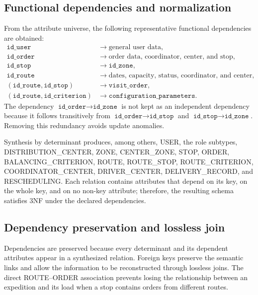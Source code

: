 \documentclass[12pt,a4paper]{article}
\newcommand{\field}[1]{\texttt{#1}}
\begin{document}
\subsection{Functional dependencies and normalization}
From the attribute universe, the following representative functional dependencies are obtained:
\begin{align*}
\field{id\_user} &\rightarrow \text{general user data},\\
\field{id\_order} &\rightarrow \text{order data, coordinator, center, and stop},\\
\field{id\_stop} &\rightarrow \field{id\_zone},\\
\field{id\_route} &\rightarrow \text{dates, capacity, status, coordinator, and center},\\
(\field{id\_route},\field{id\_stop}) &\rightarrow \field{visit\_order},\\
(\field{id\_route},\field{id\_criterion}) &\rightarrow \field{configuration\_parameters}.
\end{align*}
The dependency $\field{id\_order} \rightarrow \field{id\_zone}$ is not kept as an independent dependency because it follows transitively from $\field{id\_order} \rightarrow \field{id\_stop}$ and $\field{id\_stop} \rightarrow \field{id\_zone}$. Removing this redundancy avoids update anomalies.

Synthesis by determinant produces, among others, USER, the role subtypes, DISTRIBUTION\_CENTER, ZONE, CENTER\_ZONE, STOP, ORDER, BALANCING\_CRITERION, ROUTE, ROUTE\_STOP, ROUTE\_CRITERION, COORDINATOR\_CENTER, DRIVER\_CENTER, DELIVERY\_RECORD, and RESCHEDULING. Each relation contains attributes that depend on its key, on the whole key, and on no non-key attribute; therefore, the resulting schema satisfies 3NF under the declared dependencies.

\subsection{Dependency preservation and lossless join}
Dependencies are preserved because every determinant and its dependent attributes appear in a synthesized relation. Foreign keys preserve the semantic links and allow the information to be reconstructed through lossless joins. The direct ROUTE--ORDER association prevents losing the relationship between an expedition and its load when a stop contains orders from different routes.
\end{document}
